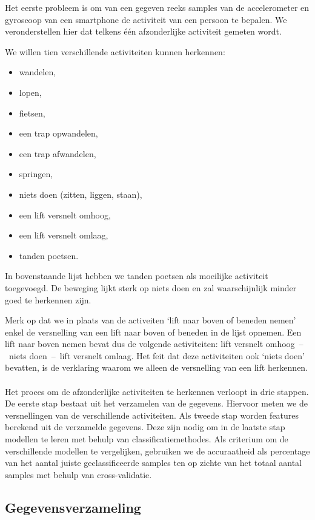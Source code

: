\documentclass{article}
\begin{document}
Het eerste probleem is om van een gegeven reeks samples van de accelerometer en gyroscoop van een smartphone de activiteit van een persoon te bepalen. We veronderstellen hier dat telkens \'e\'en afzonderlijke activiteit gemeten wordt.

We willen tien verschillende activiteiten kunnen herkennen:
\begin{itemize}
\item wandelen,
\item lopen,
\item fietsen,
\item een trap opwandelen,
\item een trap afwandelen,
\item springen,
\item niets doen (zitten, liggen, staan),
\item een lift versnelt omhoog,
\item een lift versnelt omlaag,
\item tanden poetsen.
\end{itemize}

In bovenstaande lijst hebben we tanden poetsen als moeilijke activiteit toegevoegd. De beweging lijkt sterk op niets doen en zal waarschijnlijk minder goed te herkennen zijn.

Merk op dat we in plaats van de activeiten `lift naar boven of beneden nemen' enkel de versnelling van een lift naar boven of beneden in de lijst opnemen. Een lift naar boven nemen bevat dus de volgende activiteiten: lift versnelt omhoog~--~niets doen~--~lift versnelt omlaag. Het feit dat deze activiteiten ook `niets doen' bevatten, is de verklaring waarom we alleen de versnelling van een lift herkennen.
\\~\\
Het proces om de afzonderlijke activiteiten te herkennen verloopt in drie stappen. De eerste stap bestaat uit het verzamelen van de gegevens. Hiervoor meten we de versnellingen van de verschillende activiteiten. Als tweede stap worden features berekend uit de verzamelde gegevens. Deze zijn nodig om in de laatste stap modellen te leren met behulp van classificatiemethodes. Als criterium om de verschillende modellen te vergelijken, gebruiken we de accuraatheid als percentage van het aantal juiste geclassificeerde samples ten op zichte van het totaal aantal samples met behulp van cross-validatie.


\subsection{Gegevensverzameling}
\end{document}
